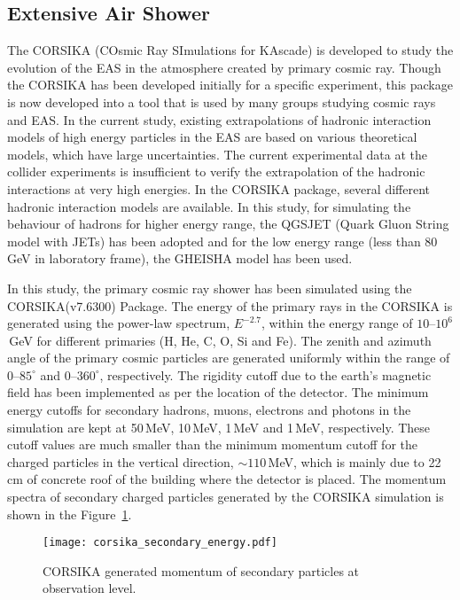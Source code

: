 \subsection{Extensive Air Shower}
The CORSIKA (COsmic Ray SImulations for KAscade) is developed to study
the evolution of the EAS in the atmosphere created by primary cosmic
ray. Though the CORSIKA has been developed initially for a specific
experiment, this package is now developed into a tool that is used
by many groups studying cosmic rays and EAS.
In the current study, existing extrapolations of hadronic interaction
models of high energy particles in the EAS are based on
various theoretical models, which have large uncertainties.
The current experimental data at the collider experiments is
insufficient to verify the extrapolation of the hadronic interactions
at very high energies. In the CORSIKA package, several different
hadronic interaction models are available. In this study, for
simulating the behaviour of hadrons for higher energy range,
the QGSJET (Quark Gluon String model with JETs)\cite{corsika763} has
been adopted and for the low energy range (less than 80\,GeV in
laboratory frame), the GHEISHA model has been used.

In this study, the primary cosmic ray shower has been simulated using
the CORSIKA(v7.6300) Package. The energy of the primary rays in the
CORSIKA is generated using the power-law spectrum, $E^{-2.7}$, within
the energy range of \mbox{$10$--$10^{6}$\,GeV} for different primaries
(H, He, C, O, Si and Fe). The zenith and azimuth angle of the primary
cosmic particles are generated uniformly within the range of
\mbox{$0$--$85^\circ$} and \mbox{$0$--$360^\circ$}, respectively. The
rigidity cutoff due to the earth's magnetic field has been implemented
as per the location of the detector. The minimum energy cutoffs for
secondary hadrons, muons, electrons and photons in the simulation are
kept at 50\,MeV, 10\,MeV, 1\,MeV and 1\,MeV, respectively. These cutoff
values are much smaller than the minimum momentum cutoff for
the charged particles in the vertical direction,
\mbox{$\sim 110$\,MeV}, which is mainly due to 22\,cm of concrete
roof of the building where the detector is placed. The momentum
spectra of secondary charged particles generated by the CORSIKA
simulation is shown in the Figure~\ref{fig:momin}.
\begin{figure}[h]
  \centering
  \texttt{[image: corsika\_secondary\_energy.pdf]} 
  \caption{CORSIKA generated momentum of secondary particles at
    observation level.}
  \label{fig:momin}
\end{figure}

